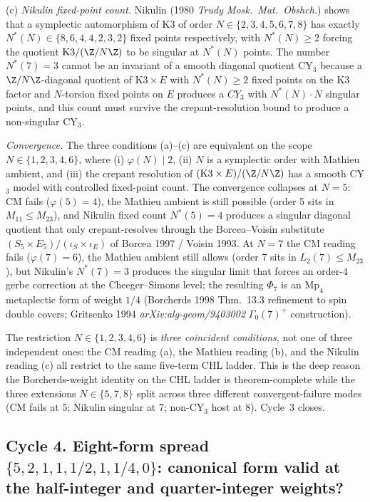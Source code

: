 (c) \emph{Nikulin fixed-point count.} Nikulin (1980 \emph{Trudy
Mosk.\ Mat.\ Obshch.}) shows that a symplectic automorphism of
K3 of order $N \in \{2, 3, 4, 5, 6, 7, 8\}$ has exactly
$N^*(N) \in \{8, 6, 4, 4, 2, 3, 2\}$ fixed points
respectively, with $N^*(N) \geq 2$ forcing the quotient
$\mathrm{K3}/(\Z/N\Z)$ to be singular at
$N^*(N)$ points. The number $N^*(7) = 3$ cannot be an
invariant of a smooth diagonal quotient CY$_3$ because a
$\Z/N\Z$-diagonal quotient of $\mathrm{K3} \times E$ with
$N^*(N) \geq 2$ fixed points on the K3 factor and $N$-torsion
fixed points on $E$ produces a $CY_3$ with $N^*(N) \cdot N$
singular points, and this count must survive the
crepant-resolution bound to produce a non-singular CY$_3$.

\emph{Convergence.} The three conditions (a)--(c) are equivalent
on the scope $N \in \{1, 2, 3, 4, 6\}$, where
(i) $\varphi(N) \mid 2$, (ii) $N$ is a symplectic order with
Mathieu ambient, and (iii) the crepant resolution of
$(\mathrm{K3}\times E)/(\Z/N\Z)$ has a smooth CY$_3$ model with
controlled fixed-point count. The convergence collapses at
$N = 5$: CM fails ($\varphi(5) = 4$), the Mathieu ambient is
still possible (order 5 sits in $M_{11} \leq M_{23}$), and
Nikulin fixed count $N^*(5) = 4$ produces a singular diagonal
quotient that only crepant-resolves through the
Borcea--Voisin substitute $(S_5 \times E_5)/(\iota_S \times
\iota_E)$ of Borcea 1997 / Voisin 1993. At $N = 7$ the CM
reading fails ($\varphi(7) = 6$), the Mathieu ambient still
allows (order 7 sits in $L_2(7) \leq M_{23}$), but Nikulin's
$N^*(7) = 3$ produces the singular limit that forces an
order-$4$ gerbe correction at the Cheeger--Simons level; the
resulting $\Phi_7$ is an $\mathrm{Mp}_4$ metaplectic form of
weight $1/4$ (Borcherds 1998 Thm.~13.3 refinement to spin
double covers; Gritsenko 1994 \emph{arXiv:alg-geom/9403002}
$\Gamma_0(7)^+$ construction).

The restriction $N \in \{1, 2, 3, 4, 6\}$ is \emph{three coincident
conditions}, not one of three independent ones: the CM reading
(a), the Mathieu reading (b), and the Nikulin reading (c) all
restrict to the same five-term CHL ladder. This is the deep
reason the Borcherds-weight identity on the CHL ladder is
theorem-complete while the three extensions $N \in \{5, 7, 8\}$
split across three different convergent-failure modes (CM fails
at $5$; Nikulin singular at $7$; non-CY$_3$ host at $8$). Cycle~3
closes.

\subsection*{Cycle 4. Eight-form spread $\{5, 2, 1, 1, 1/2, 1,
  1/4, 0\}$: canonical form valid at the half-integer and
  quarter-integer weights?}

